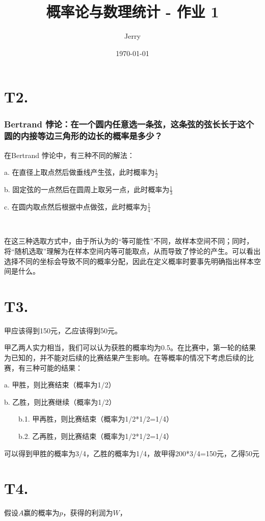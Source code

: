\documentclass[utf8]{article}
\title{\bf\huge 概率论与数理统计 - 作业 1}
\author{Jerry}
\date{\today}
\begin{document}
\maketitle

\section*{T2. }

\subsubsection*{Bertrand 悖论：在一个圆内任意选一条弦，这条弦的弦长长于这个圆的内接等边三角形的边长的概率是多少？}

在Bertrand 悖论中，有三种不同的解法：

a. 在直径上取点然后做垂线产生弦，此时概率为$\frac{1}{2}$

b. 固定弦的一点然后在圆周上取另一点，此时概率为$\frac{1}{3}$

c. 在圆内取点然后根据中点做弦，此时概率为$\frac{1}{4}$

~

在这三种选取方式中，由于所认为的“等可能性”不同，故样本空间不同；同时，将“随机选取”理解为在样本空间内等可能取点，从而导致了悖论的产生。可以看出选择不同的坐标会导致不同的概率分配，因此在定义概率时要事先明确指出样本空间是什么。

\section*{T3. }

甲应该得到150元，乙应该得到50元。

甲乙两人实力相当，我们可以认为获胜的概率均为0.5。在比赛中，第一轮的结果为已知的，并不能对后续的比赛结果产生影响。在等概率的情况下考虑后续的比赛，有三种可能的结果：

a. 甲胜，则比赛结束（概率为1/2）

b. 乙胜，则比赛继续（概率为1/2）

\ \ \ \ b.1. 甲再胜，则比赛结束（概率为1/2*1/2=1/4）

\ \ \ \ b.2. 乙再胜，则比赛结束（概率为1/2*1/2=1/4）

可以得到甲胜的概率为3/4，乙胜的概率为1/4，故甲得200*3/4=150元，乙得50元

\section*{T4. }

假设$A$赢的概率为$p$，获得的利润为$W$，
\end{document}
